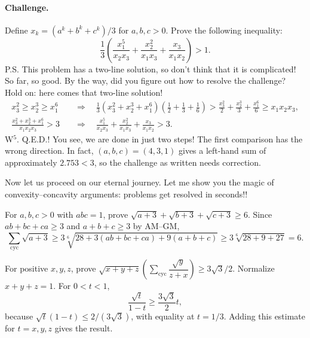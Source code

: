 \documentclass[11pt,a4paper]{article}
\begin{document}
\paragraph{Challenge.}
Define $x_k=(a^k+b^k+c^k)/3$ for $a,b,c>0$. Prove the following inequality:
\[\frac13\left(\frac{x_1^5}{x_2x_3}+\frac{x_2^2}{x_1x_3}+\frac{x_3}{x_1x_2}\right)>1.\]
P.S. This problem has a two-line solution, so don't think that it is complicated!
So far, so good. By the way, did you figure out how to resolve the challenge?
Hold on: here comes that two-line solution!
\[
\begin{aligned}
x_3^2\geq x_2^3\geq x_1^6
&\quad\Longrightarrow\quad
\frac13(x_3^2+x_2^3+x_1^6)\left(\frac12+\frac13+\frac16\right)
>\frac{x_3^2}{2}+\frac{x_2^3}{3}+\frac{x_1^6}{6}
\geq x_1x_2x_3,\\
\frac{x_3^2+x_2^3+x_1^6}{x_1x_2x_3}>3
&\quad\Longrightarrow\quad
\frac{x_1^5}{x_2x_3}+\frac{x_2^2}{x_1x_3}+\frac{x_3}{x_1x_2}>3.
\end{aligned}
\]
W$^5$. Q.E.D.! You see, we are done in just two steps!
The first comparison has the wrong direction. In fact, $(a,b,c)=(4,3,1)$
gives a left-hand sum of approximately $2.753<3$, so the challenge as written needs correction.

Now let us proceed on our eternal journey. Let me show you the magic of
convexity--concavity arguments: problems get resolved in seconds!!

For $a,b,c>0$ with $abc=1$, prove $\sqrt{a+3}+\sqrt{b+3}+\sqrt{c+3}\geq6$.
Since $ab+bc+ca\geq3$ and $a+b+c\geq3$ by AM--GM,
\[
\sum_{\mathrm{cyc}}\sqrt{a+3}
\geq3\sqrt[6]{28+3(ab+bc+ca)+9(a+b+c)}
\geq3\sqrt[6]{28+9+27}=6.
\]

For positive $x,y,z$, prove
$\sqrt{x+y+z}\left(\sum_{\mathrm{cyc}}\dfrac{\sqrt y}{z+x}\right)\geq3\sqrt3/2$.
Normalize $x+y+z=1$. For $0<t<1$,
\[
\frac{\sqrt t}{1-t}\geq\frac{3\sqrt3}{2}t,
\]
because $\sqrt t(1-t)\leq2/(3\sqrt3)$, with equality at $t=1/3$.
Adding this estimate for $t=x,y,z$ gives the result.
\end{document}
